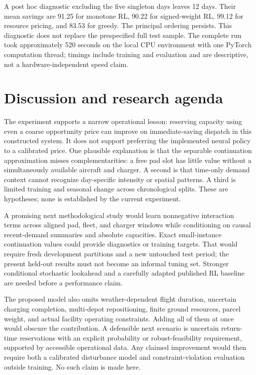 \documentclass[11pt,a4paper]{article}
\begin{document}
A post hoc diagnostic excluding the five singleton days leaves 12 days. Their mean savings are 91.25 for monotone RL, 90.22 for signed-weight RL, 99.12 for resource pricing, and 83.53 for greedy. The principal ordering persists. This diagnostic does not replace the prespecified full test sample. The complete run took approximately 520 seconds on the local CPU environment with one PyTorch computation thread; timings include training and evaluation and are descriptive, not a hardware-independent speed claim.

\section{Discussion and research agenda}
The experiment supports a narrow operational lesson: reserving capacity using even a coarse opportunity price can improve on immediate-saving dispatch in this constructed system. It does not support preferring the implemented neural policy to a calibrated price. One plausible explanation is that the separable continuation approximation misses complementarities: a free pad slot has little value without a simultaneously available aircraft and charger. A second is that time-only demand context cannot recognize day-specific intensity or spatial patterns. A third is limited training and seasonal change across chronological splits. These are hypotheses; none is established by the current experiment.

A promising next methodological study would learn nonnegative interaction terms across aligned pad, fleet, and charger windows while conditioning on causal recent-demand summaries and absolute capacities. Exact small-instance continuation values could provide diagnostics or training targets. That would require fresh development partitions and a new untouched test period; the present held-out results must not become an informal tuning set. Stronger conditional stochastic lookahead and a carefully adapted published RL baseline are needed before a performance claim.

The proposed model also omits weather-dependent flight duration, uncertain charging completion, multi-depot repositioning, finite ground resources, parcel weight, and actual facility operating constraints. Adding all of them at once would obscure the contribution. A defensible next scenario is uncertain return-time reservations with an explicit probability or robust-feasibility requirement, supported by accessible operational data. Any claimed improvement would then require both a calibrated disturbance model and constraint-violation evaluation outside training. No such claim is made here.
\end{document}
